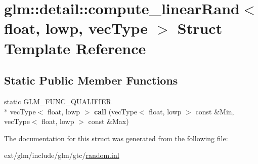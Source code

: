 \hypertarget{structglm_1_1detail_1_1compute__linear_rand_3_01float_00_01lowp_00_01vec_type_01_4}{\section{glm\-:\-:detail\-:\-:compute\-\_\-linear\-Rand$<$ float, lowp, vec\-Type $>$ Struct Template Reference}
\label{structglm_1_1detail_1_1compute__linear_rand_3_01float_00_01lowp_00_01vec_type_01_4}
}
\subsection*{Static Public Member Functions}
\begin{DoxyCompactItemize}
\item 
\hypertarget{structglm_1_1detail_1_1compute__linear_rand_3_01float_00_01lowp_00_01vec_type_01_4_a7fa98be90215a865635df999883a55ca}{static G\-L\-M\-\_\-\-F\-U\-N\-C\-\_\-\-Q\-U\-A\-L\-I\-F\-I\-E\-R \\*
vec\-Type$<$ float, lowp $>$ {\bfseries call} (vec\-Type$<$ float, lowp $>$ const \&Min, vec\-Type$<$ float, lowp $>$ const \&Max)}\label{structglm_1_1detail_1_1compute__linear_rand_3_01float_00_01lowp_00_01vec_type_01_4_a7fa98be90215a865635df999883a55ca}

\end{DoxyCompactItemize}


The documentation for this struct was generated from the following file\-:\begin{DoxyCompactItemize}
\item 
ext/glm/include/glm/gtc/\hyperlink{random_8inl}{random.\-inl}\end{DoxyCompactItemize}
